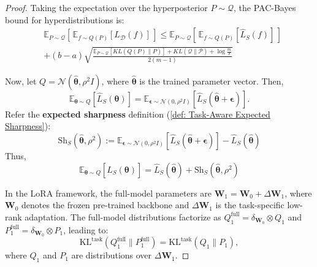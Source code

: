 \documentclass[letterpaper]{article} %
\begin{document}
\begin{proof}
Taking the expectation over the hyperposterior $P \sim \mathcal{Q}$, the PAC-Bayes bound for hyperdistributions is:
\begin{equation}
\begin{aligned}
        &\mathbb{E}_{P \sim \mathcal{Q}}\left[\, \mathbb{E}_{f \sim Q(P)} [L_{\mathcal{D}}(f)] \,\right] 
        \leq \mathbb{E}_{P \sim \mathcal{Q}}\left[\, \mathbb{E}_{f \sim Q(P)} [\hat{L}_{S}(f)] \,\right]  \\
        & + (b-a)\sqrt{ \frac{ \mathbb{E}_{P \sim \mathcal{Q}}\left[ KL(Q(P) \| P) \right] + KL(\mathcal{Q} \| \mathcal{P}) + \log \frac{m}{\delta} }{2(m-1)} }
\end{aligned}
\end{equation}


Now, let $Q = \mathcal{N}(\hat{\boldsymbol{\theta}}, \rho^2 I)$, where $\hat{\boldsymbol{\theta}}$ is the trained parameter vector. Then,
$$\mathbb{E}_{\boldsymbol{\theta} \sim Q}[\hat{L}_S(\boldsymbol{\theta})] = \mathbb{E}_{\boldsymbol{\epsilon} \sim \mathcal{N}(0, \rho^2 I)}[\hat{L}_S(\hat{\boldsymbol{\theta}} + \boldsymbol{\epsilon})].$$
Refer the \textbf{expected sharpness} definition (\ref{def: Task-Aware Expected Sharpness}):
$$\mathrm{Sh}_S(\hat{\boldsymbol{\theta}}, \rho^2) := \mathbb{E}_{\boldsymbol{\epsilon} \sim \mathcal{N}(0, \rho^2 I)}\left[ \hat{L}_S(\hat{\boldsymbol{\theta}} + \boldsymbol{\epsilon}) \right] - \hat{L}_S(\hat{\boldsymbol{\theta}})$$
Thus,
$$\mathbb{E}_{\boldsymbol{\theta} \sim Q}[\hat{L}_S(\boldsymbol{\theta})] = \hat{L}_S(\hat{\boldsymbol{\theta}}) + \mathrm{Sh}_S(\hat{\boldsymbol{\theta}}, \rho^2)$$

In the LoRA framework, the full-model parameters are $\boldsymbol{W}_1 = \boldsymbol{W}_0 + \Delta\boldsymbol{W}_1$, where $\boldsymbol{W}_0$ denotes the frozen pre-trained backbone and $\Delta\boldsymbol{W}_1$ is the task-specific low-rank adaptation. The full-model distributions factorize as $Q_1^{\text{full}} = \delta_{\boldsymbol{W}_0} \otimes Q_1$ and $P_1^{\text{full}} = \delta_{\boldsymbol{W}_0} \otimes P_1$, leading to:
\begin{equation}
    \text{KL}^{\text{task}}(Q_1^{\text{full}} \| P_1^{\text{full}}) = \text{KL}^{\text{task}}(Q_1 \| P_1),
\end{equation}
where $Q_1$ and $P_1$ are distributions over $\Delta\boldsymbol{W}_1$. 



\end{proof}
\end{document}
